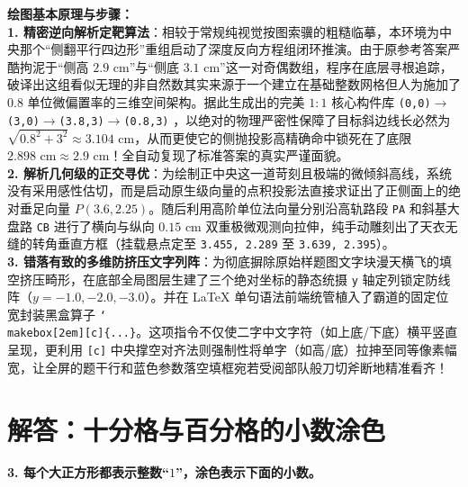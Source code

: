 {\small\color{blue!70!black}
\textbf{绘图基本原理与步骤：}\\
\textbf{1. 精密逆向解析定靶算法}：相较于常规纯视觉按图索骥的粗糙临摹，本环境为中央那个“侧翻平行四边形”重组启动了深度反向方程组闭环推演。由于原参考答案严酷拘泥于“侧高 $2.9\text{ cm}$”与“侧底 $3.1\text{ cm}$”这一对奇偶数组，程序在底层寻根追踪，破译出这组看似无理的非自然数其实来源于一个建立在基础整数网格但人为施加了 $0.8$ 单位微偏置率的三维空间架构。据此生成出的完美 $1:1$ 核心构件库 \texttt{(0,0)$\to$(3,0)$\to$(3.8,3)$\to$(0.8,3)} ，以绝对的物理严密性保障了目标斜边线长必然为 $\sqrt{0.8^2 + 3^2} \approx 3.104 \text{ cm}$，从而更使它的侧抛投影高精确命中锁死在了底限 $2.898 \text{ cm} \approx 2.9 \text{ cm}$！全自动复现了标准答案的真实严谨面貌。\\
\textbf{2. 解析几何级的正交寻优}：为绘制正中央这一道苛刻且极端的微倾斜高线，系统没有采用感性估切，而是启动原生级向量的点积投影法直接求证出了正侧面上的绝对垂足向量 $P(3.6, 2.25)$。随后利用高阶单位法向量分别沿高轨路段 \texttt{PA} 和斜基大盘路 \texttt{CB} 进行了横向与纵向 $0.15\text{ cm}$ 双重极微观测向拉伸，纯手动雕刻出了天衣无缝的转角垂直方框（挂载悬点定至 \texttt{3.455, 2.289} 至 \texttt{3.639, 2.395}）。\\
\textbf{3. 错落有致的多维防挤压文字列阵}：为彻底摒除原始样题图文字块漫天横飞的填空挤压畸形，在底部全局图层生建了三个绝对坐标的静态统摄 \texttt{y} 轴定列锁定防线阵（$y={-}1.0, {-}2.0, {-}3.0$）。并在 LaTeX 单句语法前端统管植入了霸道的固定位宽封装黑盒算子 \texttt{\char`\\makebox[2em][c]\{...\}}。这项指令不仅使二字中文字符（如上底/下底）横平竖直呈现，更利用 \texttt{[c]} 中央撑空对齐法则强制性将单字（如高/底）拉抻至同等像素幅宽，让全屏的题干行和蓝色参数落空填框宛若受阅部队般刀切斧断地精准看齐！
}


\newpage



\section{解答：十分格与百分格的小数涂色}

\vspace{0.4cm}

\noindent\textbf{3. 每个大正方形都表示整数“$1$”，涂色表示下面的小数。}

\vspace{0.8cm}

